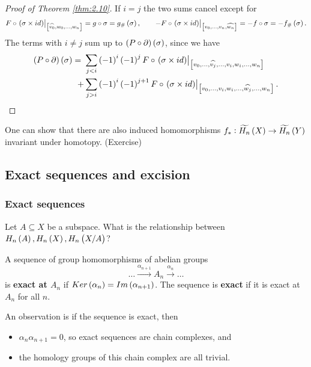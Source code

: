 \begin{proof}[Proof of Theorem \ref{thm:2.10}]
If $ i = j $ the two sums cancel except for
$$ F \circ \eval{\br{\sigma \times id}}_{\sbr{\widehat{v_0}, w_0, \dots, w_n}} = g \circ \sigma = g_\#\br{\sigma}, \qquad -F \circ \eval{\br{\sigma \times id}}_{\sbr{v_0, \dots, v_n, \widehat{w_n}}} = -f \circ \sigma = -f_\#\br{\sigma}. $$
The terms with $ i \ne j $ sum up to $ \br{P \circ \partial}\br{\sigma} $, since we have
\begin{align*}
\br{P \circ \partial}\br{\sigma}
= \ & \sum_{j < i} \br{-1}^i\br{-1}^jF \circ \eval{\br{\sigma \times id}}_{\sbr{v_0, \dots, \widehat{v_j}, \dots, v_i, w_i, \dots, w_n}} \\
+ & \sum_{j > i} \br{-1}^i\br{-1}^{j + 1}F \circ \eval{\br{\sigma \times id}}_{\sbr{v_0, \dots, v_i, w_i, \dots, \widehat{w_j}, \dots, w_n}}.
\end{align*}
\end{proof}


\begin{remark*}
One can show that there are also induced homomorphisms $ f_* : \widetilde{H_n}\br{X} \to \widetilde{H_n}\br{Y} $ invariant under homotopy. (Exercise)
\end{remark*}

\pagebreak

\subsection{Exact sequences and excision}

\subsubsection{Exact sequences}

Let $ A \subseteq X $ be a subspace. What is the relationship between $ H_n\br{A}, H_n\br{X}, H_n\br{X / A} $?

\begin{definition*}
A sequence of group homomorphisms of abelian groups
$$ \dots \xrightarrow{\alpha_{n + 1}} A_n \xrightarrow{\alpha_n} \dots $$
is \textbf{exact at $ A_n $} if $ Ker\br{\alpha_n} = Im\br{\alpha_{n + 1}} $. The sequence is \textbf{exact} if it is exact at $ A_n $ for all $ n $.
\end{definition*}

An observation is if the sequence is exact, then
\begin{itemize}
\item $ \alpha_n\alpha_{n + 1} = 0 $, so exact sequences are chain complexes, and
\item the homology groups of this chain complex are all trivial.
\end{itemize}

